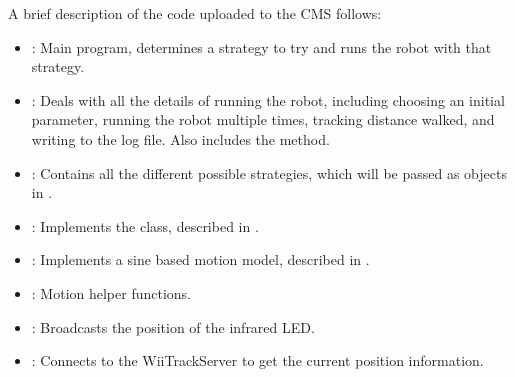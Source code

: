 A brief description of the code uploaded to the CMS follows:

\begin{itemize}
\item {}: Main program, determines a strategy to try and runs the robot
  with that strategy.
\item {}: Deals with all the details of running the robot,
  including choosing an initial parameter, running the robot multiple times, 
  tracking distance walked, and writing to the log file. Also includes the
   method.
\item {}: Contains all the different possible strategies, which
  will be passed as objects in . 
\item {}: Implements the  class, described in
  .
\item {}: Implements a sine based motion model,
  described in .
\item {}: Motion helper functions.
\item {}: Broadcasts the position of the infrared LED.
\item {}: Connects to the WiiTrackServer to get the current position information.
\end{itemize}

